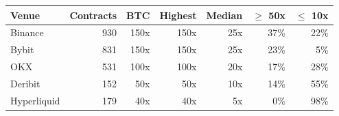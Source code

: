\begin{tabular}{@{}lrrrrrr@{}}
\toprule
Venue & Contracts & BTC & Highest & Median & $\geq$ 50x & $\leq$ 10x \\
\midrule
Binance & 930 & 150x & 150x & 25x & 37\% & 22\% \\
Bybit & 831 & 150x & 150x & 25x & 23\% & 5\% \\
OKX & 531 & 100x & 100x & 20x & 17\% & 28\% \\
Deribit & 152 & 50x & 50x & 10x & 14\% & 55\% \\
Hyperliquid & 179 & 40x & 40x & 5x & 0\% & 98\% \\
\bottomrule
\end{tabular}

